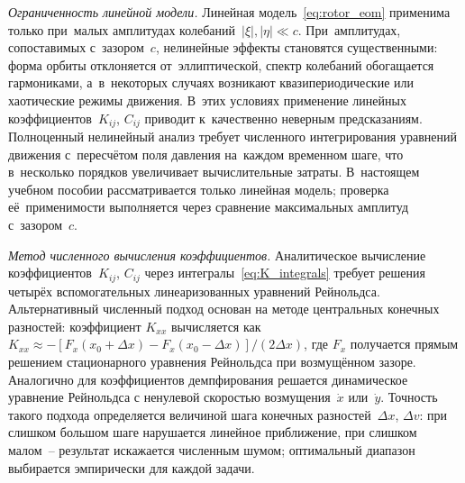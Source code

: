 \textit{Ограниченность линейной модели.}
Линейная модель~\eqref{eq:rotor_eom} применима только при~малых амплитудах колебаний~$|\xi|, |\eta| \ll c$. При~амплитудах, сопоставимых с~зазором~$c$, нелинейные эффекты становятся существенными: форма орбиты отклоняется от~эллиптической, спектр колебаний обогащается гармониками, а~в~некоторых случаях возникают квазипериодические или хаотические режимы движения. В~этих условиях применение линейных коэффициентов~$K_{ij}$, $C_{ij}$ приводит к~качественно неверным предсказаниям. Полноценный нелинейный анализ требует численного интегрирования уравнений движения с~пересчётом поля давления на~каждом временном шаге, что в~несколько порядков увеличивает вычислительные затраты. В~настоящем учебном пособии рассматривается только линейная модель; проверка её~применимости выполняется через сравнение максимальных амплитуд с~зазором~$c$.

\textit{Метод численного вычисления коэффициентов.}
Аналитическое вычисление коэффициентов~$K_{ij}$, $C_{ij}$
через интегралы~\eqref{eq:K_integrals} требует решения
четырёх вспомогательных линеаризованных уравнений Рейнольдса.
Альтернативный численный подход
основан на методе центральных конечных разностей:
коэффициент $K_{xx}$ вычисляется как
$K_{xx} \approx -[F_x(x_0 + \Delta x) -
F_x(x_0 - \Delta x)]/(2\Delta x)$, где $F_x$ получается
прямым решением стационарного уравнения Рейнольдса при
возмущённом зазоре. Аналогично для коэффициентов демпфирования
решается динамическое уравнение Рейнольдса с ненулевой
скоростью возмущения~$\dot{x}$ или~$\dot{y}$. Точность
такого подхода определяется величиной шага конечных
разностей~$\Delta x$, $\Delta v$: при слишком большом шаге
нарушается линейное приближение, при слишком малом~-- результат
искажается численным шумом; оптимальный диапазон выбирается
эмпирически для каждой задачи.
